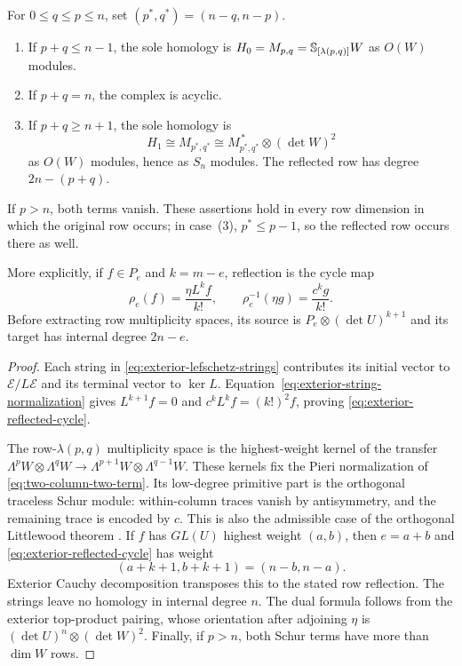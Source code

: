 \begin{theorem}
\label{thm:two-column-reflection}
For $0\le q\le p\le n$, set $(p^*,q^*)=(n-q,n-p)$.
\begin{enumerate}
\item If $p+q\le n-1$, the sole homology is
      $H_0=M_{p,q}=\mathbb S_{[\lambda(p,q)]}W$ as $O(W)$ modules.
\item If $p+q=n$, the complex is acyclic.
\item If $p+q\ge n+1$, the sole homology is
      \[
       H_1\cong M_{p^*,q^*}
          \cong M_{p^*,q^*}^{\,*}\otimes(\det W)^2
      \]
      as $O(W)$ modules, hence as $S_n$ modules.
      The reflected row has degree $2n-(p+q)$.
\end{enumerate}
If $p>n$, both terms vanish. These assertions hold in every row
dimension in which the original row occurs; in case~(3),
$p^*\le p-1$, so the reflected row occurs there as well.

More explicitly, if $f\in P_e$ and $k=m-e$, reflection is the cycle map
\begin{equation}\label{eq:exterior-reflected-cycle}
 \rho_e(f)=\frac{\eta L^kf}{k!},
 \qquad
 \rho_e^{-1}(\eta g)=\frac{c^kg}{k!}.
\end{equation}
Before extracting row multiplicity spaces, its source is
$P_e\otimes(\det U)^{k+1}$ and its target has internal degree $2n-e$.
\end{theorem}
\begin{proof}
Each string in \eqref{eq:exterior-lefschetz-strings} contributes its
initial vector to $\mathcal E/L\mathcal E$ and its terminal vector to
$\ker L$. Equation~\eqref{eq:exterior-string-normalization} gives
$L^{k+1}f=0$ and $c^kL^kf=(k!)^2f$, proving
\eqref{eq:exterior-reflected-cycle}.

The row-$\lambda(p,q)$ multiplicity space is the highest-weight kernel
of the transfer
$\Lambda^pW\otimes\Lambda^qW\to
\Lambda^{p+1}W\otimes\Lambda^{q-1}W$.
These kernels fix the Pieri normalization of
\eqref{eq:two-column-two-term}. Its low-degree primitive part is the
orthogonal traceless Schur module: within-column traces vanish by
antisymmetry, and the remaining trace is encoded by $c$.
This is also the admissible case of the orthogonal Littlewood theorem
\cite[Theorem~4.4]{SSW2013}.
If $f$ has $GL(U)$ highest weight $(a,b)$, then $e=a+b$ and
\eqref{eq:exterior-reflected-cycle} has weight
\[
       (a+k+1,b+k+1)=(n-b,n-a).
\]
Exterior Cauchy decomposition transposes this to the stated row
reflection. The strings leave no homology in internal degree $n$.
The dual formula follows from the exterior top-product pairing,
whose orientation after adjoining $\eta$ is
$(\det U)^n\otimes(\det W)^2$.
Finally, if $p>n$, both Schur terms have more than $\dim W$ rows.
\end{proof}

